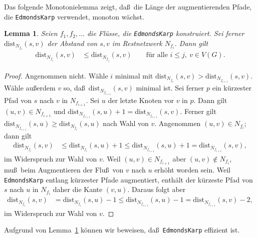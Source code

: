 \documentclass[10pt,reqno]{amsart}
\numberwithin{equation}{section}
\newtheorem{lemma}[definition]{Lemma}
\newcommand\dist{\mathrm{dist}}
\newcommand\Lem{Lemma}
\begin{document}
Das folgende Monotonielemma zeigt, da\ss\ die L\"ange der augmentierenden Pfade, die {\tt EdmondsKarp}  verwendet, monoton w\"achst.

\begin{lemma}\label{lem_mon}
	Seien $f_1,f_2,\ldots$ die Fl\"usse, die {\tt EdmondsKarp} konstruiert.
	Sei ferner $\dist_{N_{f_i}}(s,v)$ der Abstand von $s,v$ im Restnetzwerk $N_{f_i}$.
	Dann gilt 
	\begin{align*}
		\dist_{N_{f_i}}(s,v)&\leq\dist_{N_{f_j}}(s,v)\qquad\mbox{f\"ur alle }i\leq j,\ v\in V(G).
	\end{align*}
\end{lemma}
\begin{proof}
	Angenommen nicht.
	W\"ahle $i$ minimal mit $\dist_{N_{f_i}}(s,v)>\dist_{N_{f_{i+1}}}(s,v)$.
	W\"ahle au\ss erdem $v$ so, da\ss\ $\dist_{N_{f_{i+1}}}(s,v)$ minimal ist.
	Sei ferner $p$ ein k\"urzester Pfad von $s$ nach $v$ in $N_{f_{i+1}}$.
	Sei $u$ der letzte Knoten vor $v$ in $p$.
	Dann gilt $(u,v)\in N_{f_{i+1}}$ und $\dist_{N_{f_{i+1}}}(s,u)+1=\dist_{N_{f_{i+1}}}(s,v)$.
	Ferner gilt $\dist_{N_{f_{i+1}}}(s,u)\geq\dist_{N_{f_{i}}}(s,u)$ nach Wahl von $v$.
	Angenommen $(u,v)\in N_{f_i}$; dann gilt
	\begin{align*}
		\dist_{N_{f_{i}}}(s,v)&\leq\dist_{N_{f_{i}}}(s,u)+1\leq\dist_{N_{f_{i+1}}}(s,u)+1=\dist_{N_{f_{i+1}}}(s,v),
	\end{align*}
	im Widerspruch zur Wahl von $v$.
	Weil $(u,v)\in N_{f_{i+1}}$ aber $(u,v)\not\in N_{f_i}$, mu\ss\ beim Augmentieren der Flu\ss\ von $v$ nach $u$ erh\"oht worden sein.
	Weil {\tt EdmondsKarp} entlang k\"urzester Pfade augmentiert, enth\"alt der k\"urzeste Pfad von $s$ nach $u$ in $N_{f_i}$ daher die Kante $(v,u)$.
	Daraus folgt aber
	\begin{align*}
		\dist_{N_{f_{i}}}(s,v)&=\dist_{N_{f_{i}}}(s,u)-1\leq\dist_{N_{f_{i+1}}}(s,u)-1=\dist_{N_{f_{i+1}}}(s,v)-2,
	\end{align*}
	im Widerspruch zur Wahl von $v$.
\end{proof}

Aufgrund von \Lem~\ref{lem_mon} k\"onnen wir beweisen, da\ss\ {\tt EdmondsKarp} effizient ist.
\end{document}
